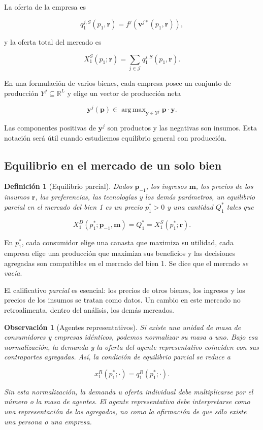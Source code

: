 \documentclass[12pt]{article}
\theoremstyle{cideplain}
\theoremstyle{cidedef}
\newtheorem{definition}[theorem]{Definición}
\newtheorem{remark}[theorem]{Observación}
\DeclareMathOperator*{\argmax}{arg\,max}
\newcommand{\R}{\mathbb{R}}
\newcommand{\p}{\mathbf{p}}
\newcommand{\y}{\mathbf{y}}
\begin{document}
La oferta de la empresa es

\[
  q_1^{j,S}(p_1,\bm r)=f^j\!\left(\bm v^{j*}(p_1,\bm r)\right),
\]

y la oferta total del mercado es

\begin{equation}
  X_1^S(p_1;\bm r)=\sum_{j\in\mathcal J}q_1^{j,S}(p_1,\bm r).
  \label{eq:market-supply}
\end{equation}

En una formulación de varios bienes, cada empresa posee un conjunto de producción
\(Y^j\subseteq\R^L\) y elige un vector de producción neta

\[
  \y^j(\p)\in\argmax_{\y\in Y^j}\p\cdot\y.
\]

Las componentes positivas de \(\y^j\) son productos y las negativas son insumos. Esta
notación será útil cuando estudiemos equilibrio general con producción.

\subsection{Equilibrio en el mercado de un solo bien}

\begin{definition}[Equilibrio parcial]
Dados \(\p_{-1}\), los ingresos \(\bm m\), los precios de los insumos \(\bm r\), las
preferencias, las tecnologías y los demás parámetros, un equilibrio parcial en el mercado
del bien 1 es un precio \(p_1^*>0\) y una cantidad \(Q_1^*\) tales que

\begin{equation}
  X_1^D(p_1^*;\p_{-1},\bm m)
  =Q_1^*
  =X_1^S(p_1^*;\bm r).
  \label{eq:partial-equilibrium}
\end{equation}
\end{definition}

En \(p_1^*\), cada consumidor elige una canasta que maximiza su utilidad, cada empresa
elige una producción que maximiza sus beneficios y las decisiones agregadas son
compatibles en el mercado del bien 1. Se dice que el mercado \emph{se vacía}.

El calificativo \emph{parcial} es esencial: los precios de otros bienes, los ingresos y los
precios de los insumos se tratan como datos. Un cambio en este mercado no retroalimenta,
dentro del análisis, los demás mercados.

\begin{remark}[Agentes representativos]
Si existe una unidad de masa de consumidores y empresas idénticos, podemos normalizar
su masa a uno. Bajo esa normalización, la demanda y la oferta del agente representativo
coinciden con sus contrapartes agregadas. Así, la condición de equilibrio parcial se reduce a

\[
  x_1^R(p_1^*;\cdot)=q_1^R(p_1^*;\cdot).
\]

Sin esta normalización, la demanda u oferta individual debe multiplicarse por el número o
la masa de agentes. El agente representativo debe interpretarse como una representación
de los agregados, no como la afirmación de que sólo existe una persona o una empresa.
\end{remark}
\end{document}
